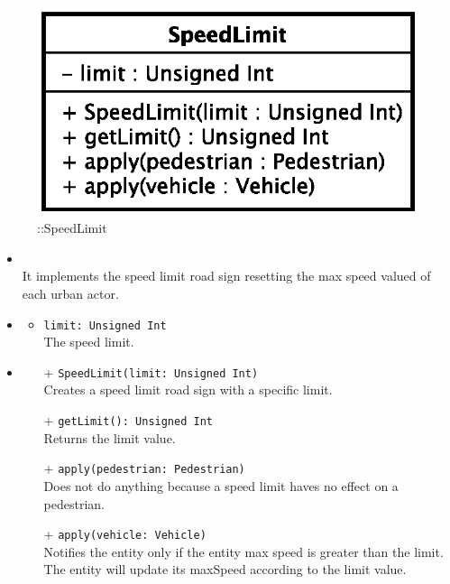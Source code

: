 \begin{figure}[h]
\centering
\includegraphics[scale=0.6,keepaspectratio]{images/solution/app/backend/speed_limit.eps}
\caption{\pPassive::SpeedLimit}
\label{fig:sd-app-speed_limit}
\end{figure}
\FloatBarrier
\begin{itemize}
  \item \textbf{\descr} \\
It implements the speed limit road sign resetting the max speed valued of each urban actor.
  \item \textbf{\attrs}
  \begin{itemize}
    \item \texttt{limit: Unsigned Int} \\
The speed limit.
  \end{itemize}
  \item \textbf{\ops}
  \begin{itemize} 
  \item[+] \texttt{SpeedLimit(limit: Unsigned Int)} \\
Creates a speed limit road sign with a specific limit.
  \item[+] \texttt{getLimit(): Unsigned Int} \\
Returns the limit value.
  \item[+] \texttt{apply(pedestrian: Pedestrian)} \\
Does not do anything because a speed limit haves no effect on a pedestrian.
  \item[+] \texttt{apply(vehicle: Vehicle)} \\
Notifies the entity only if the entity max speed is greater than the limit.
The entity will update its maxSpeed according to the limit value.
  \end{itemize}
\end{itemize}

